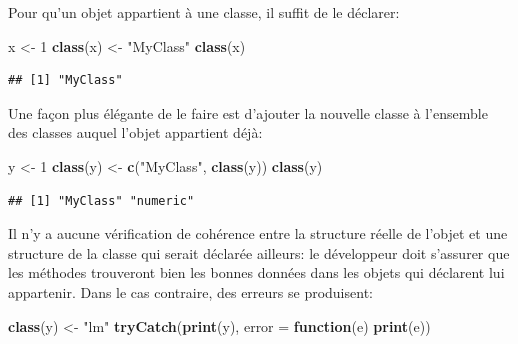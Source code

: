 \documentclass[
  12pt,
  french,
  a4paper,
  extrafontsizes,onecolumn,openright
  ]{memoir}
\newenvironment{Shaded}{\begin{snugshade}}{\end{snugshade}}
\newcommand{\ControlFlowTok}[1]{\textcolor[rgb]{0.13,0.29,0.53}{\textbf{#1}}}
\newcommand{\DataTypeTok}[1]{\textcolor[rgb]{0.13,0.29,0.53}{#1}}
\newcommand{\DecValTok}[1]{\textcolor[rgb]{0.00,0.00,0.81}{#1}}
\newcommand{\KeywordTok}[1]{\textcolor[rgb]{0.13,0.29,0.53}{\textbf{#1}}}
\newcommand{\NormalTok}[1]{#1}
\newcommand{\StringTok}[1]{\textcolor[rgb]{0.31,0.60,0.02}{#1}}
\begin{document}
Pour qu'un objet appartient à une classe, il suffit de le déclarer:

\scriptsize

\begin{Shaded}
\begin{Highlighting}[]
\NormalTok{x <-}\StringTok{ }\DecValTok{1}
\KeywordTok{class}\NormalTok{(x) <-}\StringTok{ "MyClass"}
\KeywordTok{class}\NormalTok{(x)}
\end{Highlighting}
\end{Shaded}

\begin{verbatim}
## [1] "MyClass"
\end{verbatim}

\normalsize
Une façon plus élégante de le faire est d'ajouter la nouvelle classe à l'ensemble des classes auquel l'objet appartient déjà:

\scriptsize

\begin{Shaded}
\begin{Highlighting}[]
\NormalTok{y <-}\StringTok{ }\DecValTok{1}
\KeywordTok{class}\NormalTok{(y) <-}\StringTok{ }\KeywordTok{c}\NormalTok{(}\StringTok{"MyClass"}\NormalTok{, }\KeywordTok{class}\NormalTok{(y))}
\KeywordTok{class}\NormalTok{(y)}
\end{Highlighting}
\end{Shaded}

\begin{verbatim}
## [1] "MyClass" "numeric"
\end{verbatim}

\normalsize

Il n'y a aucune vérification de cohérence entre la structure réelle de l'objet et une structure de la classe qui serait déclarée ailleurs: le développeur doit s'assurer que les méthodes trouveront bien les bonnes données dans les objets qui déclarent lui appartenir.
Dans le cas contraire, des erreurs se produisent:

\scriptsize

\begin{Shaded}
\begin{Highlighting}[]
\KeywordTok{class}\NormalTok{(y) <-}\StringTok{ "lm"}
\KeywordTok{tryCatch}\NormalTok{(}\KeywordTok{print}\NormalTok{(y), }\DataTypeTok{error =} \ControlFlowTok{function}\NormalTok{(e) }\KeywordTok{print}\NormalTok{(e))}
\end{Highlighting}
\end{Shaded}
\end{document}
